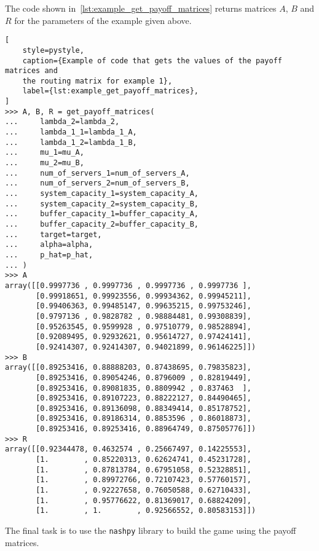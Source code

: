 The code shown in~\ref{lst:example_get_payoff_matrices} returns matrices \(A\),
\(B\) and \(R\) for the
parameters of the example given above.

\begin{lstlisting}[
    style=pystyle,
    caption={Example of code that gets the values of the payoff matrices and
    the routing matrix for example 1},
    label={lst:example_get_payoff_matrices},
]
>>> A, B, R = get_payoff_matrices(
...     lambda_2=lambda_2,
...     lambda_1_1=lambda_1_A,
...     lambda_1_2=lambda_1_B,
...     mu_1=mu_A,
...     mu_2=mu_B,
...     num_of_servers_1=num_of_servers_A,
...     num_of_servers_2=num_of_servers_B,
...     system_capacity_1=system_capacity_A,
...     system_capacity_2=system_capacity_B,
...     buffer_capacity_1=buffer_capacity_A,
...     buffer_capacity_2=buffer_capacity_B,
...     target=target,
...     alpha=alpha,
...     p_hat=p_hat,
... )
>>> A
array([[0.9997736 , 0.9997736 , 0.9997736 , 0.9997736 ],
       [0.99918651, 0.99923556, 0.99934362, 0.99945211],
       [0.99406363, 0.99485147, 0.99635215, 0.99753246],
       [0.9797136 , 0.9828782 , 0.98884481, 0.99308839],
       [0.95263545, 0.9599928 , 0.97510779, 0.98528894],
       [0.92089495, 0.92932621, 0.95614727, 0.97424141],
       [0.92414307, 0.92414307, 0.94021899, 0.96146225]])
>>> B
array([[0.89253416, 0.88888203, 0.87438695, 0.79835823],
       [0.89253416, 0.89054246, 0.8796009 , 0.82819449],
       [0.89253416, 0.89081835, 0.8809942 , 0.837463  ],
       [0.89253416, 0.89107223, 0.88222127, 0.84490465],
       [0.89253416, 0.89136098, 0.88349414, 0.85178752],
       [0.89253416, 0.89186314, 0.8853596 , 0.86018873],
       [0.89253416, 0.89253416, 0.88964749, 0.87505776]])
>>> R
array([[0.92344478, 0.4632574 , 0.25667497, 0.14225553],
       [1.        , 0.85220313, 0.62624741, 0.45231728],
       [1.        , 0.87813784, 0.67951058, 0.52328851],
       [1.        , 0.89972766, 0.72107423, 0.57760157],
       [1.        , 0.92227658, 0.76050588, 0.62710433],
       [1.        , 0.95776622, 0.81369017, 0.68824209],
       [1.        , 1.        , 0.92566552, 0.80583153]])

\end{lstlisting}

The final task is to use the \texttt{nashpy}
library to build the game using the payoff matrices.

